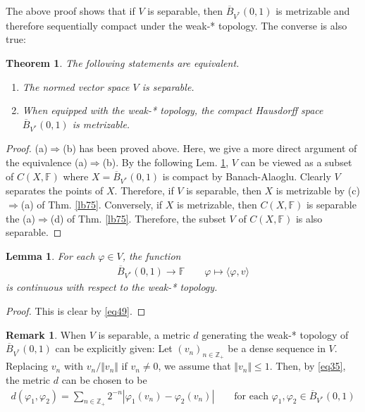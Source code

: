 \documentclass[12pt,b5paper,notitlepage]{article}
\theoremstyle{definition}
\newtheorem{rem}[df]{Remark}
\theoremstyle{plain}
\newtheorem{thm}[df]{Theorem}
\newtheorem{lm}[df]{Lemma}
\newcommand{\ovl}{\overline}
\newcommand{\bk}[1]{\langle {#1}\rangle}
\newcommand{\Zbb}{\mathbb Z}
\newcommand{\Fbb}{\mathbb F}
\numberwithin{equation}{section}
\begin{document}
The above proof shows that if $V$ is separable, then $\ovl B_{V^*}(0,1)$ is metrizable and therefore sequentially compact under the weak-* topology. The converse is also true:

\begin{thm}\label{lb76}
The following statements are equivalent.
\begin{enumerate}[label=(\alph*)]
\item The normed vector space $V$ is separable.
\item When equipped with the weak-* topology, the compact Hausdorff space $\ovl B_{V^*}(0,1)$ is metrizable. 
\end{enumerate}
\end{thm}


\begin{proof}
(a)$\Rightarrow$(b) has been proved above. Here, we give a more direct argument of the equivalence (a)$\Rightarrow$(b). By the following Lem. \ref{lb74}, $V$ can be viewed as a subset of $C(X,\Fbb)$ where $X=\ovl B_{V^*}(0,1)$ is compact by Banach-Alaoglu. Clearly $V$ separates the points of $X$. Therefore, if $V$ is separable, then $X$ is metrizable by (c)$\Rightarrow$(a) of Thm. \ref{lb75}. Conversely, if $X$ is metrizable, then $C(X,\Fbb)$ is separable the (a)$\Rightarrow$(d) of Thm. \ref{lb75}. Therefore, the subset $V$ of $C(X,\Fbb)$ is also separable.
\end{proof}

\begin{lm}\label{lb74}
For each $\varphi\in V$, the function
\begin{align*}
\ovl B_{V^*}(0,1)\rightarrow\Fbb\qquad \varphi\mapsto \bk{\varphi,v}
\end{align*}
is continuous with respect to the weak-* topology.
\end{lm}


\begin{proof}
This is clear by \eqref{eq49}.
\end{proof}


\begin{rem}
When $V$ is separable, a metric $d$ generating the weak-* topology of $\ovl B_{V^*}(0,1)$ can be explicitly given: Let $(v_n)_{n\in\Zbb_+}$ be a dense sequence in $V$. Replacing $v_n$ with $v_n/\Vert v_n\Vert$ if $v_n\neq 0$, we assume that $\Vert v_n\Vert\leq 1$. Then, by \eqref{eq35}, the metric $d$ can be chosen to be
\begin{align}
d(\varphi_1,\varphi_2)=\sum_{n\in\Zbb_+}2^{-n}|\varphi_1(v_n)-\varphi_2(v_n)|\qquad\text{for each }\varphi_1,\varphi_2\in \ovl B_{V^*}(0,1)
\end{align}
\end{rem}
\end{document}
